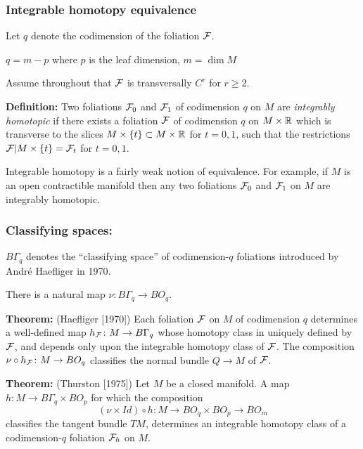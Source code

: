 \documentclass{beamer}
\begin{document}
 
\frame %
{
  \frametitle{Integrable homotopy equivalence}

 
    Let $q$ denote the codimension of the foliation ${\mathcal F}$.
    \medskip
    
    $q = m -p$ where $p$ is the leaf dimension, $m = \dim M$
    \medskip
    
    Assume throughout that ${\mathcal F}$ is transversally $C^r$ for $r \geq 2$.
 
\bigskip
 \pause
 
 {\bf Definition:} 
 Two foliations ${\mathcal F}_0$ and ${\mathcal F}_1$ of codimension $q$ on  $M$ are \emph{integrably homotopic} if there exists a foliation ${\mathcal F}$ of codimension $q$ on $M \times {\mathbb R}$ which is transverse to the slices $M \times \{t\} \subset M \times {\mathbb R}$ for $t = 0, 1$, such that the restrictions ${\mathcal F} | M \times \{t\} = {\mathcal F}_t$ for $t = 0, 1$.

\bigskip

 Integrable homotopy is a fairly weak notion of equivalence. For example, if $M$ is an open contractible manifold then any two foliations ${\mathcal F}_0$ and ${\mathcal F}_1$ on $M$ are integrably homotopic.
 
 \vfill
 
}

 
\frame %
{
  \frametitle{Classifying  spaces:}

   
   $B\Gamma_q$ denotes the   ``classifying space''  of   codimension-$q$ foliations introduced by Andr\'{e}  Haefliger  in 1970. 
   \medskip
   
There is a natural map $\nu \colon B\Gamma_q \to BO_q$.
   

 \medskip
 \pause

   {\bf Theorem:} (Haefliger [1970]) Each   foliation  ${\mathcal F}$ on $M$ of codimension $q$ determines a well-defined map $h_{{\mathcal F}} \colon M \to B\Gamma_q$ whose homotopy class in uniquely defined by ${\mathcal F}$, and depends only upon the integrable homotopy class of ${\mathcal F}$.
    The composition $\nu \circ h_{{\mathcal F}} \colon M \to BO_q$ classifies the normal bundle $Q \to M$ of ${\mathcal F}$.
 
 \medskip
 \pause
 
  {\bf Theorem:} (Thurston [1975]) Let $M$ be a closed manifold. A map  
  $h \colon M \to B\Gamma_q \times BO_p$ for which the composition 
  $$(\nu \times Id) \circ h \colon M \to BO_q \times BO_p \to BO_m$$ 
  classifies the tangent bundle $TM$, determines an integrable homotopy class of  
   a codimension-$q$ foliation ${\mathcal F}_h$ on $M$.
 
 
 \vfill
 
}
 
\end{document}
